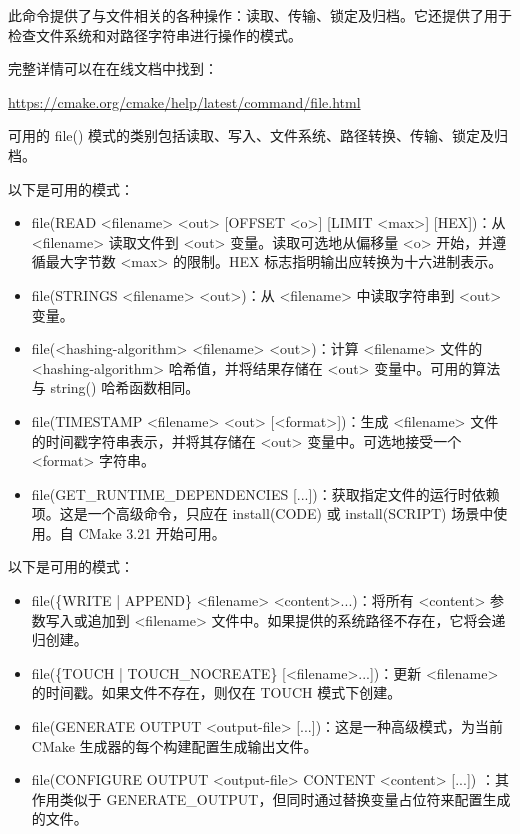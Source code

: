 
此命令提供了与文件相关的各种操作：读取、传输、锁定及归档。它还提供了用于检查文件系统和对路径字符串进行操作的模式。

完整详情可以在在线文档中找到：

\url{https://cmake.org/cmake/help/latest/command/file.html}

可用的 file() 模式的类别包括读取、写入、文件系统、路径转换、传输、锁定及归档。


以下是可用的模式：

\begin{itemize}
\item
file(READ <filename> <out> [OFFSET <o>] [LIMIT <max>] [HEX])：从 <filename> 读取文件到 <out> 变量。读取可选地从偏移量 <o> 开始，并遵循最大字节数 <max> 的限制。HEX 标志指明输出应转换为十六进制表示。

\item
file(STRINGS <filename> <out>)：从 <filename> 中读取字符串到 <out> 变量。

\item
file(<hashing-algorithm> <filename> <out>)：计算 <filename> 文件的 <hashing-algorithm> 哈希值，并将结果存储在 <out> 变量中。可用的算法与 string() 哈希函数相同。

\item
file(TIMESTAMP <filename> <out> [<format>])：生成 <filename> 文件的时间戳字符串表示，并将其存储在 <out> 变量中。可选地接受一个 <format> 字符串。

\item
file(GET\_RUNTIME\_DEPENDENCIES [...])：获取指定文件的运行时依赖项。这是一个高级命令，只应在 install(CODE) 或 install(SCRIPT) 场景中使用。自 CMake 3.21 开始可用。
\end{itemize}


以下是可用的模式：

\begin{itemize}
\item
file(\{WRITE | APPEND\} <filename> <content>...)：将所有 <content> 参数写入或追加到 <filename> 文件中。如果提供的系统路径不存在，它将会递归创建。

\item
file(\{TOUCH | TOUCH\_NOCREATE\} [<filename>...])：更新 <filename> 的时间戳。如果文件不存在，则仅在 TOUCH 模式下创建。

\item
file(GENERATE OUTPUT <output-file> [...])：这是一种高级模式，为当前 CMake 生成器的每个构建配置生成输出文件。

\item
file(CONFIGURE OUTPUT <output-file> CONTENT <content> [...]) ：其作用类似于 GENERATE\_OUTPUT，但同时通过替换变量占位符来配置生成的文件。
\end{itemize}

